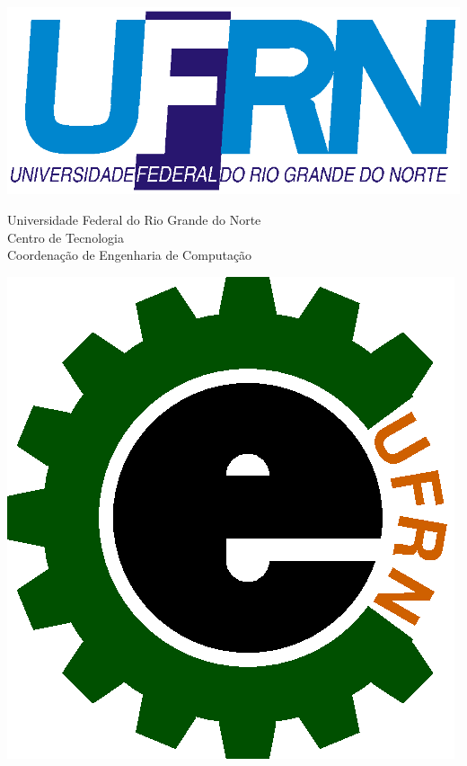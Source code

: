 \documentclass[a4paper, 12pt]{article}
\begin{document}
\thispagestyle{empty}

\begin{minipage}{0.15\linewidth}
\begin{flushleft}
\includegraphics[width=\linewidth]{UFRN}
\end{flushleft}
\end{minipage}\hfill
\begin{minipage}{0.65\linewidth}
\centering Universidade Federal do Rio Grande do Norte\\
Centro de Tecnologia\\
Coordenação de Engenharia de Computação
\end{minipage}\hfill
\begin{minipage}{0.15\linewidth}
\begin{flushright}
\includegraphics[width=0.6\linewidth]{EngComp}
\end{flushright}
\end{minipage}


\end{document}
